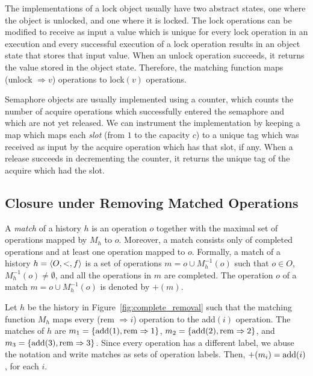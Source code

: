 \begin{example}[Locks]

  The implementations of a lock object usually have two abstract states, one
  where the object is unlocked, and one where it is locked. The lock operations
  can be modified to receive as input a value which is unique for every lock
  operation in an execution and every successful execution of a lock operation
  results in an object state that stores that input value. When an unlock
  operation succeeds, it returns the value stored in the object state.
  Therefore, the matching function maps (\textnormal{unlock} $\Rightarrow v$) operations to
  \textnormal{lock}$(v)$ operations.

\end{example}

\begin{example}[Semaphores]

  Semaphore objects are usually implemented using a counter, which counts the
  number of acquire operations which successfully entered the semaphore and
  which are not yet released. We can instrument the implementation by keeping a
  map which maps each \emph{slot} (from $1$ to the capacity $c$) to a unique
  tag which was received as input by the acquire operation which has that slot,
  if any. When a release succeeds in decrementing the counter, it returns the
  unique tag of the acquire which had the slot.

\end{example}

\subsection{Closure under Removing Matched Operations}

A \emph{match} of a history $h$ is an operation $o$ together with the maximal 
set of operations mapped by $M_h$ to $o$. 
Moreover, a match consists only of 
completed operations and at least one operation mapped to $o$. Formally, a match of a 
history $h={\langle{O,<,f}\rangle}$ is a set of operations $m=o\cup M^{-1}_h(o)$ such 
that $o\in O$, $M^{-1}_h(o)\neq \emptyset$, and all the operations in $m$
are completed. The operation $o$ of a match $m=o\cup M^{-1}_h(o)$ 
is denoted by $+(m)$.

\begin{example}

  Let $h$ be the history in Figure~\ref{fig:complete_removal} such that the
  matching function $M_h$ maps every (\textnormal{rem} $\Rightarrow i$) operation to the
  \textnormal{add}$(i)$ operation. The matches of $h$ are $m_1 = {\{  \textnormal{add}(1),
  \textnormal{rem}\Rightarrow 1  \}}$, $m_2 = {\{  \textnormal{add}(2),
  \textnormal{rem}\Rightarrow 2  \}}$, and $m_3 = {\{  \textnormal{add}(3),
  \textnormal{rem}\Rightarrow 3  \}}$. Since every operation has a different label, we
  abuse the notation and write matches as sets of operation labels. Then,
  $+(m_i) = \textnormal{add}(i)$, for each $i$.

\end{example}

